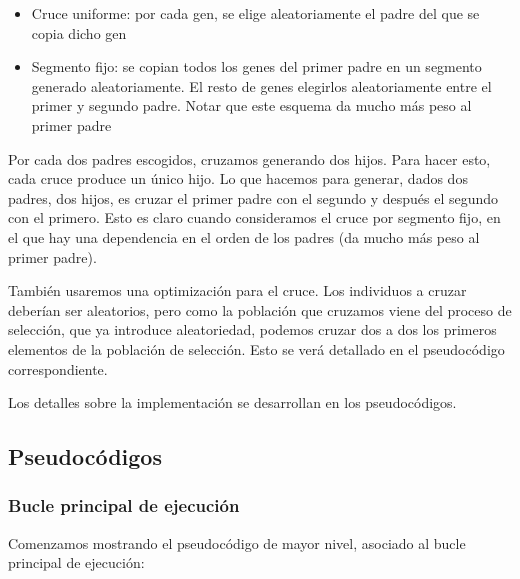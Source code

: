 \documentclass[11pt]{article}
\begin{document}
\begin{itemize}
    \item Cruce uniforme: por cada gen, se elige aleatoriamente el padre del que se copia dicho gen
    \item Segmento fijo: se copian todos los genes del primer padre en un segmento generado aleatoriamente. El resto de genes elegirlos aleatoriamente entre el primer y segundo padre. Notar que este esquema da mucho más peso al primer padre
\end{itemize}

Por cada dos padres escogidos, cruzamos generando dos hijos. Para hacer esto, cada cruce produce un único hijo. Lo que hacemos para generar, dados dos padres, dos hijos, es cruzar el primer padre con el segundo y después el segundo con el primero. Esto es claro cuando consideramos el cruce por segmento fijo, en el que hay una dependencia en el orden de los padres (da mucho más peso al primer padre).

También usaremos una optimización para el cruce. Los individuos a cruzar deberían ser aleatorios, pero como la población que cruzamos viene del proceso de selección, que ya introduce aleatoriedad, podemos cruzar dos a dos los primeros elementos de la población de selección. Esto se verá detallado en el pseudocódigo correspondiente.

Los detalles sobre la implementación se desarrollan en los pseudocódigos.

\subsection{Pseudocódigos}

\subsubsection{Bucle principal de ejecución}

Comenzamos mostrando el pseudocódigo de mayor nivel, asociado al bucle principal de ejecución:
\end{document}
